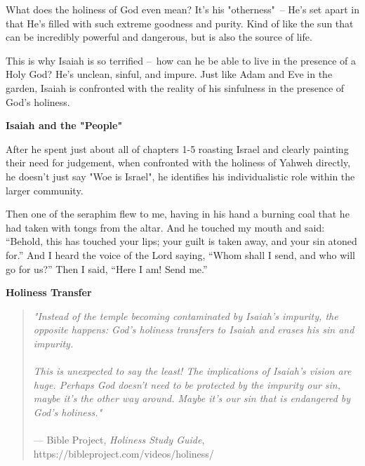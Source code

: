 \documentclass[11pt]{article}
\begin{document}
What does the holiness of God even mean? It's his "otherness" – He's set apart in that He's filled with such extreme goodness and purity. Kind of like the sun that can be incredibly powerful and dangerous, but is also the source of life.

This is why Isaiah is so terrified – how can he be able to live in the presence of a Holy God?
He's unclean, sinful, and impure. Just like Adam and Eve in the garden, Isaiah is confronted with the reality of his sinfulness in the presence of God's holiness.

{\vspace{4em}}
{\large\bfseries Isaiah and the "People"}
{\vspace{1em}}

After he spent just about all of chapters 1-5 roasting Israel and clearly painting their need for judgement, when confronted with the holiness of Yahweh directly, he doesn't just say "Woe is Israel", he identifies his individualistic role within the larger community.

\newpage

\begin{biblicaloutline}[Isaiah 6:6-8]
    
         Then one of the seraphim flew to me, having in his hand a burning coal that he had taken with tongs from the altar.
         And he touched my mouth and said: ``Behold, this has touched your lips; your guilt is taken away, and your sin atoned for.''
          And I heard the voice of the Lord saying, ``Whom shall I send, and who will go for us?'' Then I said, ``Here I am! Send me.''

\end{biblicaloutline}


{\vspace{4em}}
{\large\bfseries Holiness Transfer}

{\vspace{1em}}

\begin{quote}
\textit{"Instead of the temple becoming contaminated
by Isaiah’s impurity, the opposite happens: God’s
holiness transfers to Isaiah and erases his sin and
impurity.\\\\This is unexpected to say the least! The implications of Isaiah's vision are huge.
  Perhaps God doesn't need to be protected by the impurity our
  sin, maybe it's the other way around. Maybe it's our sin that
   is endangered by God's holiness."}\\\\
\hfill --- Bible Project, \textit{Holiness Study Guide}, https://bibleproject.com/videos/holiness/
\end{quote}
\end{document}
